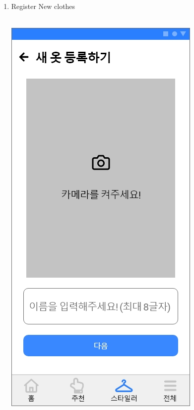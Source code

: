 \documentclass[conference]{IEEEtran}
\begin{document}
\begin{enumerate}
 \item Register New clothes\\ \\
 \begin{enumerate}
    \centerline{\includegraphics[scale=0.24]{새 옷 등록하기1.jpg}
}
\end{enumerate}
\end{enumerate}
\end{document}
